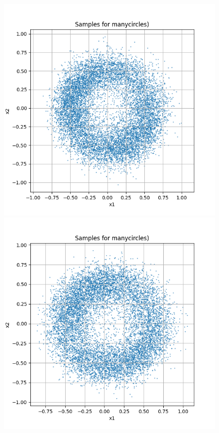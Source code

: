 \documentclass[a4paper,12pt]{article}
\begin{document}
\begin{figure}[H]
  \begin{minipage}{0.3\textwidth}
      \centering
      \includegraphics[width=\linewidth]{"images/Samples for ddpm_2_100_0.0001_0.02_manycircles.png"}
  \end{minipage}
  \begin{minipage}{0.3\textwidth}
      \centering
      \includegraphics[width=\linewidth]{"images/Samples for ddpm_2_150_0.0001_0.02_manycircles.png"}

\end{minipage}
\end{figure}
\end{document}
